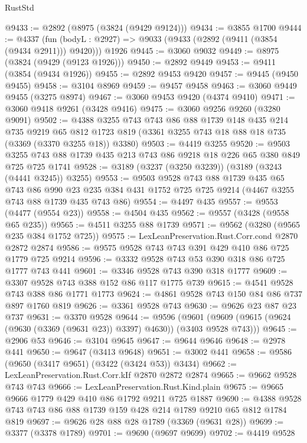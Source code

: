 \begin{lexlean}{RustStd}
\begin{coremodule}
@9433 := @2892 (@8975 (@3824 (@9429 @9124)))
@9434 := @3855 @1700
@9444 := @4337
    (fun (bodyL : @2927) => @9033 (@9433 (@2892 (@9411 (@3854 (@9434 @2911))) @9420)))
    @1926
@9445 := @3060 @9032
@9449 := @8975 (@3824 (@9429 (@9123 @1926)))
@9450 := @2892 @9449
@9453 := @9411 (@3854 (@9434 @1926))
@9455 := @2892 @9453 @9420
@9457 := @9445 (@9450 @9455)
@9458 := @3104 @8969
@9459 := @9457 @9458
@9463 := @3060 @9449 @9455 (@3275 @8974)
@9467 := @3060 @9453 @9420 (@4374 @9410)
@9471 := @3060 @9418 @9261 (@3428 @9416)
@9475 := @3060 @9256 @9260 (@3280 @9091)
@9502 := @4388
    @3255
    @743
    @743
    @86
    @88
    @1739
    @148
    @435
    @214
    @735
    @9219
    @65
    @812
    @1723
    @819
    (@3361 @3255 @743 @18 @88 @18 @735 (@3369 (@3370 @3255 @18)) @3380)
@9503 := @4419 @3255
@9520 := @9503 @3255 @743 @88 @1739 @435 @213 @743 @86 @9218 @18 @226 @65 @380 @849 @725 @725 @1741
@9528 := @3189 (@3237 (@3250 @3239)) (@3189 (@3243 (@4441 @3245)) @3255)
@9553 := @9503
    @9528
    @743
    @88
    @1739
    @435
    @65
    @743
    @86
    @990
    @23
    @235
    @384
    @431
    @1752
    @725
    @725
    @9214
    (@4467 @3255 @743 @88 @1739 @435 @743 @86)
@9554 := @4497 @435
@9557 := @9553 (@4477 (@9554 @23))
@9558 := @4504 @435
@9562 := @9557 (@3428 (@9558 @65 @235))
@9565 := @4511 @3255 @88 @1739
@9571 := @9562 (@3280 (@9565 @235 @384 @1752 @725))
@9575 := LexLeanPreservation.Rust.Corr.cond @2870 @2872 @2874
@9586 := @9575 @9528 @743 @743 @391 @429 @410 @86 @725 @1779 @725 @9214
@9596 := @3332 @9528 @743 @53 @390 @318 @86 @725 @1777 @743 @441
@9601 := @3346 @9528 @743 @390 @318 @1777
@9609 := @3307 @9528 @743 @388 @152 @86 @117 @1775 @739
@9615 := @4541 @9528 @743 @388 @86 @1771 @1773
@9624 := @4861 @9528 @743 @150 @84 @86 @737 @897 @1760 @819
@9626 := @3361 @9528 @743
@9630 := @9626 @23 @87 @23 @737
@9631 := @3370 @9528
@9644 := @9596
    (@9601 (@9609 (@9615 (@9624 (@9630 (@3369 (@9631 @23)) @3397) @4630)) (@3403 @9528 @743)))
@9645 := @2906 @53
@9646 := @3104 @9645
@9647 := @9644 @9646
@9648 := @2978 @441
@9650 := @9647 (@3413 @9648)
@9651 := @3002 @441
@9658 := @9586 (@9650 (@3417 @9651) (@3422 (@3424 @53)) @3434)
@9662 := LexLeanPreservation.Rust.Corr.kIf @2870 @2872 @2874
@9665 := @9662 @9528 @743 @743
@9666 := LexLeanPreservation.Rust.Kind.plain
@9675 := @9665 @9666 @1779 @429 @410 @86 @1792 @9211 @725 @1887
@9690 := @4388 @9528 @743 @743 @86 @88 @1739 @159 @428 @214 @1789 @9210 @65 @812 @1784 @819
@9697 := @9626 @28 @88 @28 @1789 (@3369 (@9631 @28))
@9699 := @3377 (@3378 @1789)
@9701 := @9690 (@9697 @9699)
@9702 := @4419 @9528

\end{coremodule}
\end{lexlean}
